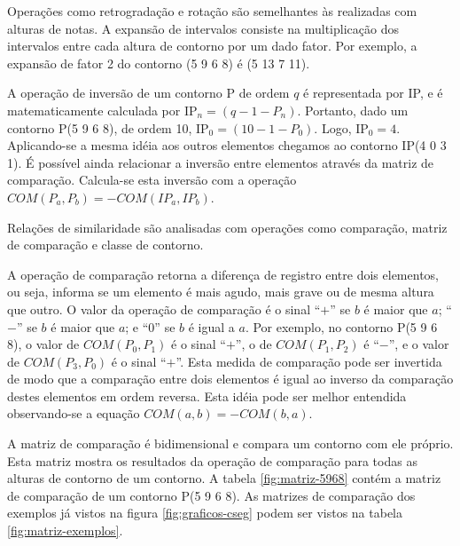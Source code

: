 Operações como retrogradação e rotação são semelhantes às realizadas
com alturas de notas. A expansão de intervalos consiste na
multiplicação dos intervalos entre cada altura de contorno por um dado
fator. Por exemplo, a expansão de fator 2 do contorno (5 9 6 8) é (5
13 7 11).

A operação de inversão de um contorno P de ordem $q$ é representada
por IP, e é matematicamente calculada por
IP$_n=(q-1-P_n)$. Portanto, dado um contorno P(5 9 6 8), de ordem
10, IP$_0=(10-1-P_0)$. Logo, IP$_0=4$. Aplicando-se a mesma idéia
aos outros elementos chegamos ao contorno IP(4 0 3 1). É possível
ainda relacionar a inversão entre elementos através da matriz de
comparação. Calcula-se esta inversão com a operação
$COM(P_a,P_b)=-COM(IP_a,IP_b)$.

Relações de similaridade \cite{marvin.ea87:relating} são analisadas
com operações como comparação, matriz de comparação e classe de
contorno.

A operação de comparação  retorna a diferença de registro
entre dois elementos, ou seja, informa se um elemento é mais agudo,
mais grave ou de mesma altura que outro. O valor da operação de
comparação é o sinal ``$+$'' se $b$ é maior que $a$; ``$-$'' se $b$ é
maior que $a$; e ``$0$'' se $b$ é igual a $a$. Por exemplo, no
contorno P(5 9 6 8), o valor de $COM(P_0,P_1)$ é o sinal ``$+$'', o de
$COM(P_1,P_2)$ é ``$-$'', e o valor de $COM(P_3,P_0)$ é o sinal
``$+$''. Esta medida de comparação pode ser invertida de modo que a
comparação entre dois elementos é igual ao inverso da comparação
destes elementos em ordem reversa. Esta idéia pode ser melhor
entendida observando-se a equação $COM(a,b)=-COM(b,a)$.

A matriz de comparação é bidimensional e compara um contorno com ele
próprio. Esta matriz mostra os resultados da operação de comparação
para todas as alturas de contorno de um contorno. A tabela
\ref{fig:matriz-5968} contém a matriz de comparação de um contorno P(5
9 6 8). As matrizes de comparação dos exemplos já vistos na figura
\ref{fig:graficos-cseg} podem ser vistos na tabela
\ref{fig:matriz-exemplos}.

